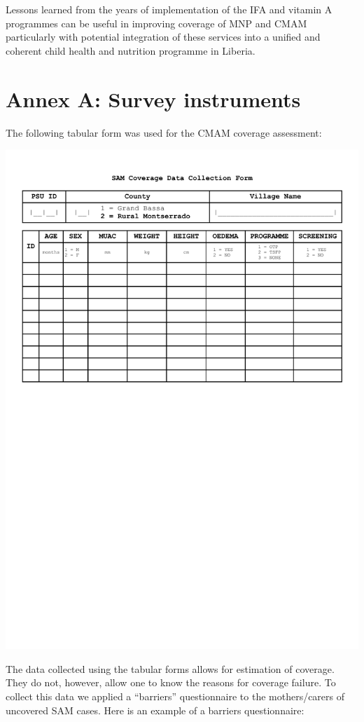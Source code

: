 \documentclass[12pt,a4paper]{article}
\begin{document}
Lessons learned from the years of implementation of the IFA and vitamin A programmes can be useful in improving coverage of MNP and CMAM particularly with potential integration of these services into a unified and coherent child health and nutrition programme in Liberia.

\newpage

\hypertarget{annex-a-survey-instruments}{%
\section*{Annex A: Survey instruments}\label{annex-a-survey-instruments}}

The following tabular form was used for the CMAM coverage assessment:

\begin{center}\includegraphics[width=0.9\linewidth]{forms/samForm} \end{center}

The data collected using the tabular forms allows for estimation of coverage. They do not, however, allow one to know the reasons for coverage failure. To collect this data we applied a ``barriers'' questionnaire to the mothers/carers of uncovered SAM cases. Here is an example of a barriers questionnaire:
\end{document}
